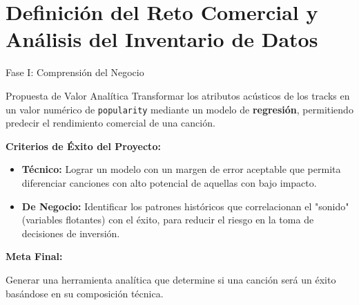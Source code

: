 \documentclass[10pt, xcolor=x11names,compress]{beamer}
\begin{document}
\section[Definición del Reto Comercial y Análisis del Inventario de Datos]{Definición del Reto Comercial y Análisis del Inventario de Datos}
\begin{frame}{Fase I: Comprensión del Negocio}
    \begin{block}{Propuesta de Valor Analítica}
        Transformar los atributos acústicos de los tracks en un valor numérico de \texttt{popularity} mediante un modelo de \textbf{regresión}, permitiendo predecir el rendimiento comercial de una canción.
    \end{block}
    
    \vspace{0.2cm}
    \textbf{Criterios de Éxito del Proyecto:}
    \begin{itemize}
        \item \textbf{Técnico:} Lograr un modelo con un margen de error aceptable que permita diferenciar canciones con alto potencial de aquellas con bajo impacto.
        \item \textbf{De Negocio:} Identificar los patrones históricos que correlacionan el "sonido" (variables flotantes) con el éxito, para reducir el riesgo en la toma de decisiones de inversión.
    \end{itemize}
    
    \vspace{0.2cm}
    \textbf{Meta Final:}
    \par Generar una herramienta analítica que determine si una canción será un éxito basándose en su composición técnica.
\end{frame}
\end{document}
